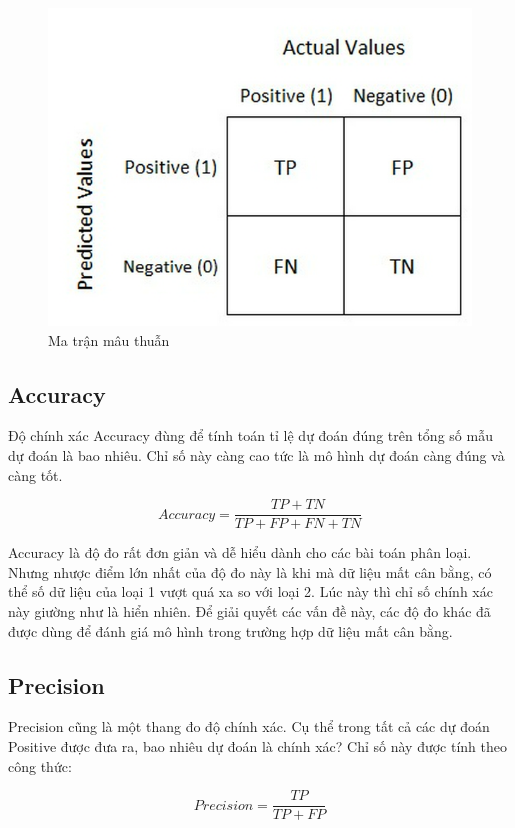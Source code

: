 \begin{figure}[H]
    \centering
    \includegraphics[scale = 0.5]{Images/confusion_matrix.jpg}
    \caption{Ma trận mâu thuẫn}
    \label{cofusion_matrix}
\end{figure}

\subsection{Accuracy} \label{accu}

Độ chính xác Accuracy đùng để tính toán tỉ lệ dự đoán đúng trên tổng số mẫu dự đoán là bao nhiêu. Chỉ số này càng cao tức là mô hình dự đoán càng đúng và càng tốt.

\[Accuracy = \frac{TP + TN}{TP + FP + FN + TN}\]

Accuracy là độ đo rất đơn giản và dễ hiểu dành cho các bài toán phân loại. Nhưng nhược điểm lớn nhất của độ đo này là khi mà dữ liệu mất cân bằng, có thể số dữ liệu của loại 1 vượt quá xa so với loại 2. Lúc này thì chỉ số chính xác này giường như là hiển nhiên. Để giải quyết các vấn đề này, các độ đo khác đã được dùng để đánh giá mô hình trong trường hợp dữ liệu mất cân bằng.

\subsection{Precision}
Precision cũng là một thang đo độ chính xác. Cụ thể trong tất cả các dự đoán Positive được đưa ra, bao nhiêu dự đoán là chính xác? Chỉ số này được tính theo công thức:

\[Precision = \frac{TP}{TP + FP}\]

